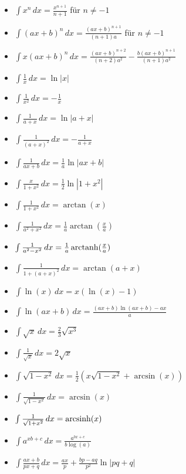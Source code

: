 \begin{itemize}[leftmargin=*]
	\item $\int x^n \, dx = \frac{x^{n+1}}{n+1}$ \hspace{0.3cm} für $n \neq -1$
  	\item $\int(ax + b)^n \,dx = \frac{(ax + b)^{n+1}}{(n + 1)a}$ \hspace{0.3cm} für $n \neq -1$
	\item $\int x(ax+b)^n \,dx = \frac{(ax + b)^{n+2}}{(n+2)a^2} - \frac{b(ax+b)^{n+1}}{(n+1)a^2}$

  	\item $\int \frac{1}{x} \,dx = \ln |x|$
	\item $\int \frac{1}{x^2} \,dx = -\frac{1}{x}$
  	\item $\int \frac{1}{a+x} \,dx = \ln |a+x|$
  	\item $\int \frac{1}{(a+x)^2} \,dx = - \frac{1}{a+x}$
	\item $\int \frac{1}{ax+b} \,dx = \frac{1}{a} \ln |ax+b|$
	\item $\int \frac{x}{1 + x^2} \, dx = \frac{1}{2} \ln |1 + x^2|$

	\item $\int \frac{1}{1 + x^2} \, dx = \arctan(x)$
	\item $\int \frac{1}{a^2 + x^2} \,dx = \frac{1}{a} \arctan(\frac{x}{a})$
	\item $\int \frac{1}{a^2 - x^2} \,dx = \frac{1}{a} \operatorname{arctanh}(\frac{x}{a})$
	\item $\int \frac{1}{1 + (a + x)^2} \, dx = \arctan(a + x)$
	
	
  	\item $\int \ln(x) \,dx = x(\ln(x) - 1)$
  	\item $\int \ln(ax + b) \,dx = \frac{(a x+b) \ln (a x+b)-a x}{a}$
	
	\item $\int \sqrt{x} \,dx = \frac{2}{3}\sqrt{x^3}$
	\item $\int \frac{1}{\sqrt{x}} \,dx = 2 \sqrt{x}$	
	\item $\int \sqrt{1-x^2} \,dx = \frac{1}{2}\left( x\sqrt{1-x^2}+ \arcsin(x) \right)$
	\item $\int \frac{1}{\sqrt{1 - x^2}} \, dx = \arcsin(x)$
	\item $\int \frac{1}{\sqrt{1 + x^2}} \, dx = \operatorname{arcsinh}(x)$

	\item $\int a^{xb + c} \,dx = \frac{a^{bx + c}}{b \log(a)}$
	\item $\int \frac{ax + b}{px + q} \,dx = \frac{ax}{p} + \frac{bp - aq}{p^2} \ln |pq+q|$
\end{itemize}

